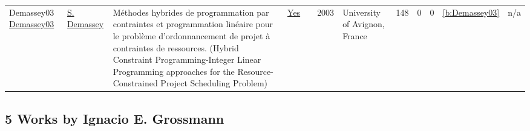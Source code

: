 {\begin{longtable}{>{\raggedright\arraybackslash}p{3cm}>{\raggedright\arraybackslash}p{6cm}>{\raggedright\arraybackslash}p{6.5cm}rrrp{2.5cm}rrrrr}
Demassey03 \href{https://tel.archives-ouvertes.fr/tel-00293564}{Demassey03} & \hyperref[auth:a246]{S. Demassey} & M{\'{e}}thodes hybrides de programmation par contraintes et programmation lin{\'{e}}aire pour le probl{\`{e}}me d'ordonnancement de projet {\`{a}} contraintes de ressources. (Hybrid Constraint Programming-Integer Linear Programming approaches for the Resource-Constrained Project Scheduling Problem) & \href{../works/Demassey03.pdf}{Yes} & \cite{Demassey03} & 2003 & University of Avignon, France & 148 & 0 & 0 & \ref{b:Demassey03} & n/a\\
\end{longtable}
}

\clearpage
\subsection{5 Works by Ignacio E. Grossmann}
\label{sec:a388}
